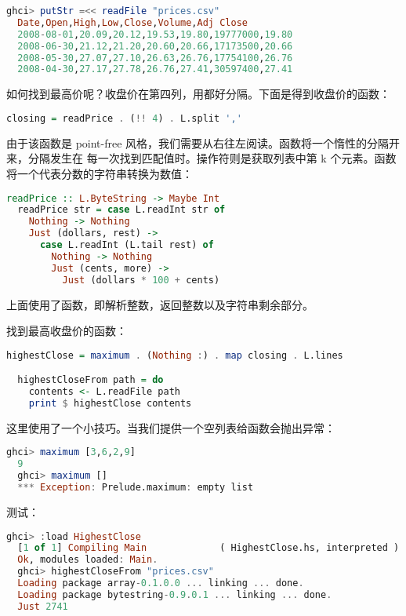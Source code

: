\documentclass[./main.tex]{subfiles}
\begin{document}
\begin{lstlisting}[language=Haskell]
  ghci> putStr =<< readFile "prices.csv"
  Date,Open,High,Low,Close,Volume,Adj Close
  2008-08-01,20.09,20.12,19.53,19.80,19777000,19.80
  2008-06-30,21.12,21.20,20.60,20.66,17173500,20.66
  2008-05-30,27.07,27.10,26.63,26.76,17754100,26.76
  2008-04-30,27.17,27.78,26.76,27.41,30597400,27.41
\end{lstlisting}

如何找到最高价呢？收盘价在第四列，用都好分隔。下面是得到收盘价的函数：

\begin{lstlisting}[language=Haskell]
  closing = readPrice . (!! 4) . L.split ','
\end{lstlisting}

由于该函数是 point-free 风格，我们需要从右往左阅读。函数将一个惰性的分隔开来，分隔发生在
每一次找到匹配值时。\acode{(!!)}操作符则是获取列表中第 k 个元素。函数将一个代表分数的字符串转换为数值：

\begin{lstlisting}[language=Haskell]
  readPrice :: L.ByteString -> Maybe Int
  readPrice str = case L.readInt str of
    Nothing -> Nothing
    Just (dollars, rest) ->
      case L.readInt (L.tail rest) of
        Nothing -> Nothing
        Just (cents, more) ->
          Just (dollars * 100 + cents)
\end{lstlisting}

上面使用了函数，即解析整数，返回整数以及字符串剩余部分。

找到最高收盘价的函数：

\begin{lstlisting}[language=Haskell]
  highestClose = maximum . (Nothing :) . map closing . L.lines

  highestCloseFrom path = do
    contents <- L.readFile path
    print $ highestClose contents
\end{lstlisting}

这里使用了一个小技巧。当我们提供一个空列表给函数会抛出异常：

\begin{lstlisting}[language=Haskell]
  ghci> maximum [3,6,2,9]
  9
  ghci> maximum []
  *** Exception: Prelude.maximum: empty list
\end{lstlisting}

测试：

\begin{lstlisting}[language=Haskell]
  ghci> :load HighestClose
  [1 of 1] Compiling Main             ( HighestClose.hs, interpreted )
  Ok, modules loaded: Main.
  ghci> highestCloseFrom "prices.csv"
  Loading package array-0.1.0.0 ... linking ... done.
  Loading package bytestring-0.9.0.1 ... linking ... done.
  Just 2741
\end{lstlisting}
\end{document}
